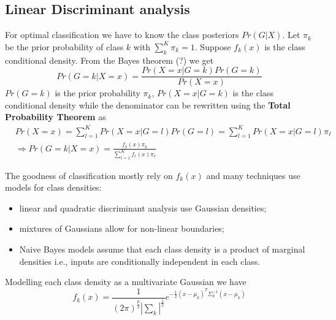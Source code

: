 \documentclass[12pt, letterpaper]{article}
\theoremstyle{definition}
\begin{document}
\subsection{Linear Discriminant analysis}
\label{LDA}
For optimal classification we have to know the class posteriors $Pr\left( G|X\right)$. Let $\pi_k$ be the prior probability of class $k$ with $\sum_k^K \pi_k=1$. Suppose $f_k(x)$ is the class conditional density.
From the Bayes theorem (?) we get 
\begin{equation}
Pr\left( G=k | X=x\right) = \frac{Pr\left( X=x |G=k \right)Pr(G=k)}{Pr(X=x)}
\end{equation}
% 
$Pr(G=k)$ is the prior probability $\pi_k$, $Pr\left( X=x |G=k \right)$ is the class conditional density while the denominator can be rewritten using the \textbf{Total Probability Theorem} as
\begin{align}
&Pr(X=x) = \sum_{l=1}^{K} Pr(X=x|G=l) Pr(G=l) = \sum_{l=1}^{K} Pr(X=x|G=l) \pi_\ell\\
&\Rightarrow Pr\left( G=k | X=x\right) =\frac{f_k(x)\pi_k}{\sum_{l=1}^Kf_\ell(x)\pi_\ell}
\end{align}

The goodness of classification mostly rely on $f_k(x)$ and many techniques use models for class densities:
\begin{itemize}
\item linear and quadratic discriminant analysis use Gaussian densities;
\item mixtures of Gaussians allow for non-linear boundaries;
\item Naive Bayes models assume that each class density is a product of marginal densities i.e., inputs are conditionally independent in each class.
\end{itemize}
Modelling each class density as a multivariate Gaussian we have
\begin{equation}
f_k(x) = \frac{1}{(2\pi)^{\frac{p}{2}}|\sum_k|^{\frac{1}{2	}}} e^{-\frac{1}{2}\left( x-\mu_k\right)^T\Sigma_k^{-1}\left( x-\mu_k\right)}
\end{equation}
\end{document}
